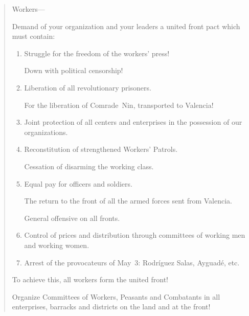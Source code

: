 \medskip

\begin{oframed}
  \begin{quote}
  	\sffamily
  	\normalsize
  	\raggedright
  	
  	\medskip
  	
  	Workers---
  
    \smallskip
  	
  	Demand of your organization and your leaders a united front pact which must contain:
  
    \smallskip
  
    \begin{enumerate}[leftmargin=2em, labelindent=0.5em, itemindent=-1em]
      \item Struggle for the freedom of the workers’ press!
      
      Down with political censorship!
      
      \item Liberation of all revolutionary prisoners.
      
      For the liberation of Comrade~Nin,{\indexANin} transported to Valencia!
      
      \item Joint protection of all centers and enterprises in the possession of our organizations.
      
      \item Reconstitution of strengthened Workers’ Patrols.
      
      Cessation of disarming the working class.
      
      \item Equal pay for officers and soldiers.
      
      The return to the front of all the armed forces sent from Valencia.
      
      General offensive on all fronts.
      
      \item Control of prices and distribution through committees of working men and working women.
      
      \item Arrest of the provocateurs of May~3: Rodr\'iguez Salas, Ayguad\'e, etc.
    \end{enumerate}
  
    \smallskip
  
    To achieve this, all workers form the united front!
    
    \smallskip
    
    Organize Committees of Workers, Peasants and Combatants in all enterprises, barracks and districts on the land and at the front!
    
    \medskip
  \end{quote}
\end{oframed}

